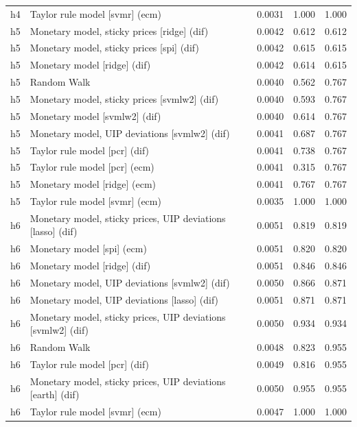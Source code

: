 \begin{ThreePartTable}
\begin{longtable}[t]{cp{5.5cm}ccc}
h4 & \raggedright Taylor rule model [svmr] (ecm) & 0.0031 & 1.000 & 1.000\\
\addlinespace
h5 & \raggedright Monetary model, sticky prices [ridge] (dif) & 0.0042 & 0.612 & 0.612\\
h5 & \raggedright Monetary model, sticky prices [spi] (dif) & 0.0042 & 0.615 & 0.615\\
h5 & \raggedright Monetary model [ridge] (dif) & 0.0042 & 0.614 & 0.615\\
h5 & \raggedright Random Walk & 0.0040 & 0.562 & 0.767\\
h5 & \raggedright Monetary model, sticky prices [svmlw2] (dif) & 0.0040 & 0.593 & 0.767\\
h5 & \raggedright Monetary model [svmlw2] (dif) & 0.0040 & 0.614 & 0.767\\
h5 & \raggedright Monetary model, UIP deviations [svmlw2] (dif) & 0.0041 & 0.687 & 0.767\\
h5 & \raggedright Taylor rule model [pcr] (dif) & 0.0041 & 0.738 & 0.767\\
h5 & \raggedright Taylor rule model [pcr] (ecm) & 0.0041 & 0.315 & 0.767\\
h5 & \raggedright Monetary model [ridge] (ecm) & 0.0041 & 0.767 & 0.767\\
h5 & \raggedright Taylor rule model [svmr] (ecm) & 0.0035 & 1.000 & 1.000\\
\addlinespace
h6 & \raggedright Monetary model, sticky prices, UIP deviations [lasso] (dif) & 0.0051 & 0.819 & 0.819\\
h6 & \raggedright Monetary model [spi] (ecm) & 0.0051 & 0.820 & 0.820\\
h6 & \raggedright Monetary model [ridge] (dif) & 0.0051 & 0.846 & 0.846\\
h6 & \raggedright Monetary model, UIP deviations [svmlw2] (dif) & 0.0050 & 0.866 & 0.871\\
h6 & \raggedright Monetary model, UIP deviations [lasso] (dif) & 0.0051 & 0.871 & 0.871\\
h6 & \raggedright Monetary model, sticky prices, UIP deviations [svmlw2] (dif) & 0.0050 & 0.934 & 0.934\\
h6 & \raggedright Random Walk & 0.0048 & 0.823 & 0.955\\
h6 & \raggedright Taylor rule model [pcr] (dif) & 0.0049 & 0.816 & 0.955\\
h6 & \raggedright Monetary model, sticky prices, UIP deviations [earth] (dif) & 0.0050 & 0.955 & 0.955\\
h6 & \raggedright Taylor rule model [svmr] (ecm) & 0.0047 & 1.000 & 1.000\\

\end{longtable}
\end{ThreePartTable}
